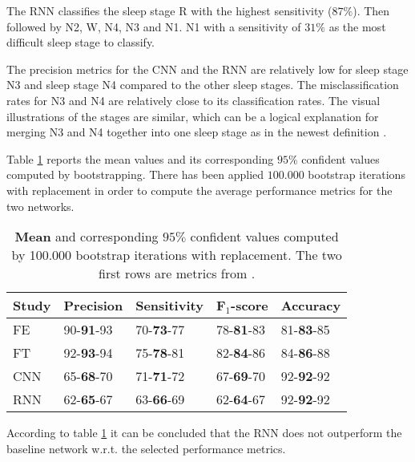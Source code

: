 The RNN classifies the sleep stage R with the highest sensitivity ($87\%$). Then followed by N2, W, N4, N3 and N1. N1 with a sensitivity of $31\%$ as the most difficult sleep stage to classify.

The precision metrics for the CNN and the RNN are relatively low for sleep stage N3 and sleep stage N4 compared to the other sleep stages. The misclassification rates for N3 and N4 are relatively close to its classification rates. 
The visual illustrations of the stages are similar, which can be a logical explanation for merging N3 and N4 together into one sleep stage as in the newest definition \cite{AASM}.



Table \ref{tab_res_2} reports the mean values and its corresponding $95\%$ confident values computed by bootstrapping. There has been applied $100.000$ bootstrap iterations with replacement in order to compute the average performance metrics for the two networks.
\begin{table}[th!]
\centering
\begin{tabular}{l | llll}
Study & Precision & Sensitivity & F$_1$-score & Accuracy \\\hline
FE \cite{main_ar} & 90-\textbf{91}-93 & 70-\textbf{73}-77 & 78-\textbf{81}-83 & 81-\textbf{83}-85\\
FT \cite{main_ar} & 92-\textbf{93}-94 & 75-\textbf{78}-81 & 82-\textbf{84}-86 & 84-\textbf{86}-88\\\hline
CNN               & 65-\textbf{68}-70 & 71-\textbf{71}-72 & 67-\textbf{69}-70 & 92-\textbf{92}-92\\
RNN               & 62-\textbf{65}-67 & 63-\textbf{66}-69 & 62-\textbf{64}-67 & 92-\textbf{92}-92
\end{tabular}
\caption{\textbf{Mean} and corresponding $95\%$ confident values computed by 100.000 bootstrap iterations with replacement. The two first rows are metrics from \cite{main_ar}.}
\label{tab_res_2}
\end{table}
According to table \ref{tab_res_2} it can be concluded that the RNN does not outperform the baseline network w.r.t. the selected performance metrics.

